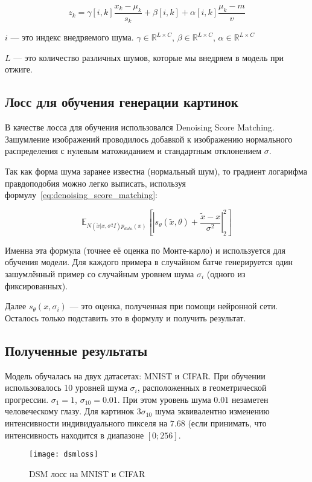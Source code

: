 \documentclass{article}
\begin{document}
\[
z_k = \gamma[i, k] \frac{x_k - \mu_k}{s_k} + \beta[i,k] + \alpha[i,k]\frac{\mu_k - m}{v}
\]

$i$ --- это индекс внедряемого шума.
$\gamma \in \mathbb{R}^{L \times C}$, $\beta \in \mathbb{R}^{L \times C}$, $\alpha \in \mathbb{R}^{L \times C}$

$L$ --- это количество различных шумов, которые мы внедряем в модель при отжиге.

\subsection{Лосс для обучения генерации картинок}

В качестве лосса для обучения использовался Denoising Score Matching.
Зашумление изображений проводилось добавкой к изображению нормального
распределения с нулевым матожиданием и стандартным отклонением $\sigma$.

Так как форма шума заранее известна (нормальный шум), то градиент
логарифма правдоподобия можно легко выписать, используя
формулу~\ref{eq:denoising_score_matching}:

\[
\mathbb{E}_{N(\tilde{x} | x, \sigma^2 I)p_{data}(x)} \left[
|s_{\theta}(\tilde{x}, \theta) + \frac{\tilde{x} - x}{\sigma^2}|_2^2 \right]
\]

Именна эта формула (точнее её оценка по Монте-карло) и используется для
обучения модели. Для каждого примера в случайном батче генерируется один
зашумлённый пример со случайным уровнем шума $\sigma_i$ (одного из
фиксированных).

Далее $s_{\theta}(x, \sigma_i)$ --- это оценка, полученная при помощи
нейронной сети. Осталось только подставить это в формулу и получить
результат.

\subsection{Полученные результаты}

Модель обучалась на двух датасетах: MNIST и CIFAR. 
При обучении использовалось 10 уровней шума $\sigma_i$, расположенных
в геометрической прогрессии. $\sigma_1 = 1$, $\sigma_{10} = 0.01$.
При этом уровень шума $0.01$ незаметен человеческому глазу. Для
картинок $3\sigma_{10}$ шума эквивалентно изменению интенсивности
индивидуального пикселя на $7.68$ (если принимать, что интенсивность
находится в диапазоне $[0; 256]$.

\begin{figure}
    \centering
    \texttt{[image: dsmloss]}
    \caption{DSM лосс на MNIST и CIFAR}\label{fig:dsmloss}
\end{figure}
\end{document}
